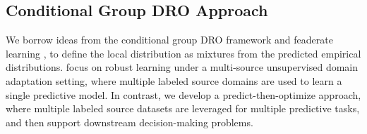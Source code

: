 \documentclass[mnsc, nonblindrev]{informswp}
\newcommand{\1}[1]{\mathds{1}{\left(#1\right)}}
\begin{document}
\subsection{Conditional Group DRO Approach}
We borrow ideas from the conditional group DRO framework and feaderate learning  \citep{marfoq2021federated, wang2025distributionally}, to define the local distribution as mixtures from the predicted empirical distributions. \citet{wang2025distributionally} focus on robust learning under a multi-source unsupervised domain adaptation setting, where multiple labeled source domains are used to learn a single predictive model. In contrast, we develop a predict-then-optimize approach, where multiple labeled source datasets are leveraged for multiple predictive tasks, and then support downstream decision-making problems. 
\end{document}
